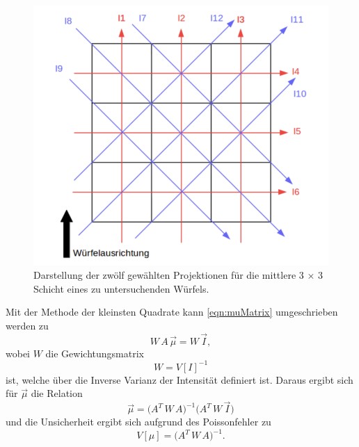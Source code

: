 \begin{figure}[H]
    \centering
    \includegraphics[scale=0.7]{Abbildungen/Ausrichtung.png}
    \caption{Darstellung der zwölf gewählten Projektionen für die mittlere 3 × 3 Schicht eines zu untersuchenden Würfels.\cite{V14}}
    \label{fig:Ausrichtung}
\end{figure}

Mit der Methode der kleinsten Quadrate kann \autoref{eqn:muMatrix} umgeschrieben werden zu
\begin{equation}
    W \,A \,\vec{\mu} = W \,\vec{I},
\end{equation}
wobei $W$ die Gewichtungsmatrix
\begin{equation}
    W = V[I]^{-1}
\end{equation}
ist, welche über die Inverse Varianz der Intensität definiert ist. Daraus ergibt sich für $\vec{\mu}$ die Relation
\begin{equation}
    \vec{\mu} = \biggl(A^T\, W \,A\biggr)^{-1} \biggl(A^T \,W \,\vec{I}\biggr)
\end{equation}
und die Unsicherheit ergibt sich aufgrund des Poissonfehler zu
\begin{equation}
    V[\mu] = \biggl(A^T\, W \,A\biggr)^{-1}.
    \label{eqn:Unsicherheit}
\end{equation}



